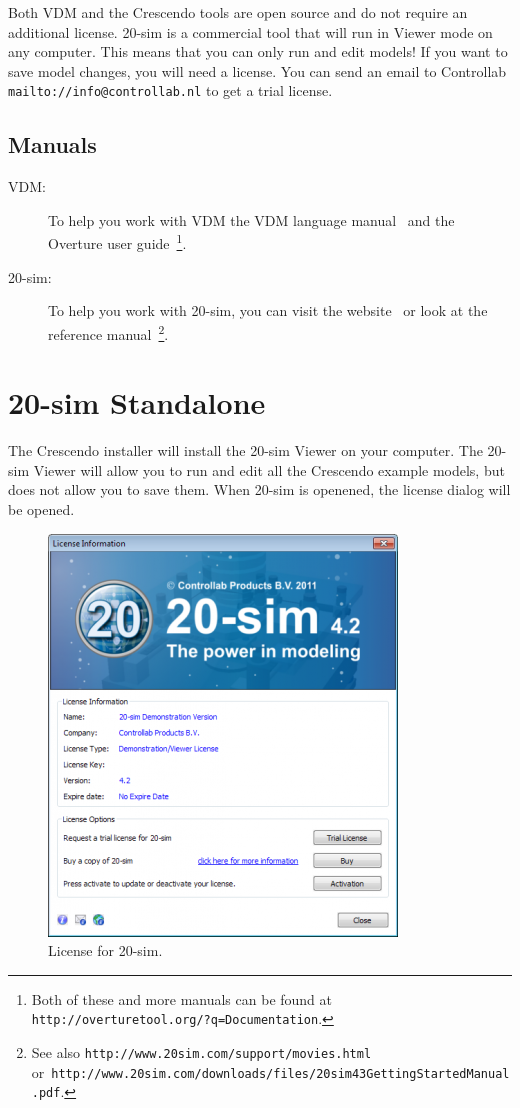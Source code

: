 \documentclass{crescendorepchap}
\newcommand{\url}[1]{\texttt{#1}}
\begin{document}
Both VDM and the Crescendo tools are open source and do not require an
additional license. 20-sim is a commercial tool that will run in
Viewer mode on any computer. This means that you
can only run and edit models! If you want to save model changes, you will need
a license. You can send an email to
Controllab \url{mailto://info@controllab.nl} to get a trial license.

\subsection{Manuals}

\begin{description}
\item[VDM:] To help you work with VDM the VDM language manual~\cite{Larsen&13b} and the Overture user guide~\cite{Larsen&13a}\footnote{Both of these and more manuals can be found at
  \url{http://overturetool.org/?q=Documentation}.}.
\item[20-sim:] To help you work with 20-sim, you can visit the
  website~\cite{20sim} or look at the reference
  manual~\cite{Kleijn09}\footnote{See also
    \url{http://www.20sim.com/support/movies.html}
    or~\url{http://www.20sim.com/downloads/files/20sim43GettingStartedManual.pdf}.}.
\end{description}

\section{20-sim Standalone}

The Crescendo installer will install the 20-sim Viewer on your computer.
The 20-sim Viewer will allow you to run and edit all the Crescendo example
models, but does not allow you to save them. When 20-sim is openened,
the license dialog will be opened.

\begin{figure}[htbp]
\centering
\includegraphics[width=.4\textwidth]{images/20simLicense.png}
\caption{License for 20-sim.}
\end{figure}
\end{document}
